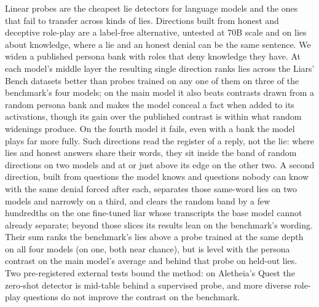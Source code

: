 Linear probes are the cheapest lie detectors for language models and the ones that fail to transfer
across kinds of lies. Directions built from honest and deceptive role-play are a label-free alternative,
untested at 70B scale and on lies about knowledge, where a lie and an honest denial can be the same
sentence. We widen a published persona bank with roles that deny knowledge they have. At each model's
middle layer the resulting single direction ranks lies across the Liars' Bench datasets better than probes
trained on any one of them on three of the benchmark's four models; on the main model it also beats
contrasts drawn from a random persona bank and makes the model conceal a fact when added to its
activations, though its gain over the published contrast is within what random widenings produce. On the
fourth model it fails, even with a bank the model plays far more fully. Such directions read the register
of a reply, not the lie: where lies and honest answers share their words, they sit inside the band of
random directions on two models and at or just above its edge on the other two. A second direction, built
from questions the model knows and questions nobody can know with the same denial forced after each,
separates those same-word lies on two models and narrowly on a third, and clears the random band by a few
hundredths on the one fine-tuned liar whose transcripts the base model cannot already separate; beyond
those slices its results lean on the benchmark's wording. Their sum ranks the benchmark's lies above a
probe trained at the same depth on all four models (on one, both near chance), but is level with the
persona contrast on the main model's average and behind that probe on held-out lies. Two pre-registered
external tests bound the method: on Aletheia's Quest the zero-shot detector is mid-table behind a
supervised probe, and more diverse role-play questions do not improve the contrast on the benchmark.
